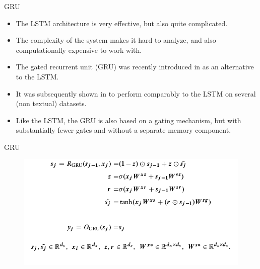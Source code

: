 \documentclass[handout]{beamer}
\begin{document}
\begin{frame}{GRU}
\begin{scriptsize}

\begin{itemize}
\item The LSTM architecture is very effective, but also quite complicated.
\item The complexity of the system makes it hard to analyze, and also computationally expensive to work with.
\item The gated recurrent unit (GRU) was recently introduced in \cite{cho2014learning} as an alternative to the LSTM.
\item It was subsequently shown in \cite{chung2014empirical} to perform comparably to the LSTM on several (non textual) datasets.
\item Like the LSTM, the GRU is also based on a gating mechanism, but with substantially fewer gates and without a separate memory component.
\end{itemize}
\end{scriptsize}
\end{frame}



\begin{frame}{GRU}
  \begin{figure}[h]
        	\includegraphics[scale = 0.35]{pics/GRU.png}
        \end{figure}        
\end{frame}
\end{document}
